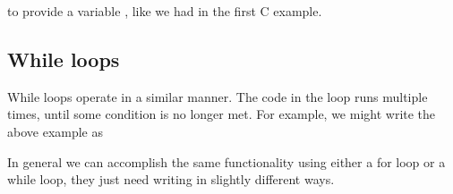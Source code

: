 \documentclass[letterpaper,10pt,british]{sphinxmanual}
\begin{document}
\begin{sphinxVerbatim}[commandchars=\\\{\}]
  \PYG{p}{[}         \PYG{p}{]}
  
    
        
\end{sphinxVerbatim}

\sphinxAtStartPar
to provide a variable , like we had in the first C example.


\subsection{While loops}
\label{\detokenize{chapters/programming_fundamentals/conditionals_and_loops:while-loops}}
\sphinxAtStartPar
While loops operate in a similar manner. The code in the loop runs multiple times, until some condition is no longer met. For example, we might write the above example as

\begin{sphinxVerbatim}[commandchars=\\\{\}]
  \PYG{p}{[}         \PYG{p}{]}
  
  
   
        \PYG{p}{[}\PYG{p}{]}
\end{sphinxVerbatim}

\sphinxAtStartPar
In general we can accomplish the same functionality using either a for loop or a while loop, they just need writing in slightly different ways.
\end{document}

